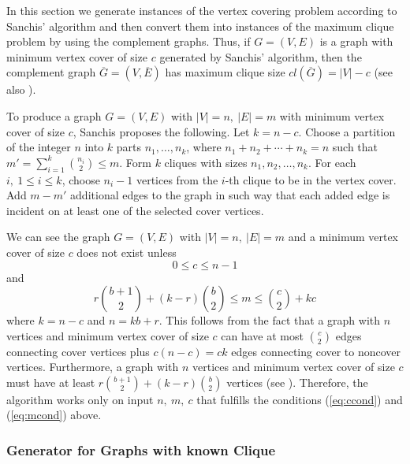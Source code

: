 In this section we generate instances of the
vertex covering problem according to Sanchis' algorithm and then convert
them into instances of the maximum clique problem by using the
complement graphs. Thus, if $G=(V,E)$ is a graph with
minimum vertex cover of size $c$ generated by Sanchis' algorithm, then
the complement graph $\overline{G}=(V,\overline{E})$ has
maximum clique size $cl(\overline{G}) = |V|-c$ (see also \cite{Par}).

To produce a graph $G=(V,E)$ with $|V| = n,\ |E| = m$ with minimum
vertex cover of size $c$, Sanchis proposes the following. Let $k = n-c$.
Choose a partition of the integer $n$ into $k$ parts
$n_{1},\ldots,n_{k}$, where $n_{1}+n_{2}+\cdots+n_{k} = n$ such that
$m' = \sum_{i=1}^{k} {n_{i} \choose 2} \leq m$. Form $k$ cliques with
sizes $n_{1},n_{2},\ldots,n_{k}$. For each $i,\ 1 \leq i \leq k$,
choose $n_{i}-1$ vertices from the $i$-th clique to be in the vertex
cover. Add $m-m'$ additional edges to the graph in such way that each
added edge is incident on at least one of the selected cover vertices.

We can see the graph $G = (V,E)$ with $|V| = n,\ |E|
= m$ and a minimum vertex cover of size $c$ does not exist unless
\begin{equation}
0 \leq c \leq n-1
\label{eq:ccond}
\end{equation}
and
\begin{equation}
r{{b+1} \choose 2}+(k-r){b \choose 2} \leq m \leq {c \choose 2} +kc
\label{eq:mcond}
\end{equation}
where $k = n-c$ and $n = kb+r$. This follows from the fact
that a graph with $n$ vertices and minimum vertex cover of size $c$
can have at most ${c \choose 2}$ edges connecting
cover vertices plus $c(n-c) = ck$ edges connecting
cover to noncover vertices. Furthermore, a graph with $n$ vertices and minimum
vertex cover of size $c$ must have at least
$r{{b+1} \choose 2}+(k-r){b \choose 2}$ vertices (see \cite{San2}).
Therefore, the algorithm works only on input $n,\ m,\ c$ that fulfills the
conditions (\ref{eq:ccond}) and (\ref{eq:mcond}) above.

\subsubsection{Generator for Graphs with known Clique}

